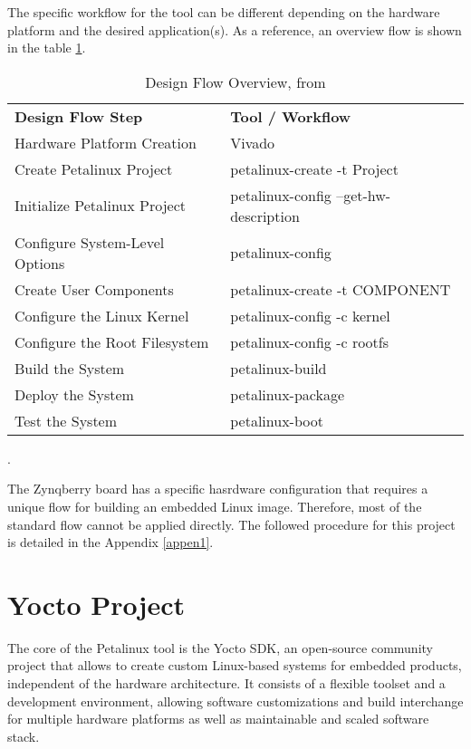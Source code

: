 The specific workflow for the tool can be different depending on the hardware platform and the
desired application(s). As a reference, an overview flow is shown in the table
\ref{table:design-flow-overview}.

\begin{table}[ht]
	\centering
	\footnotesize
	\begin{tabular} {| l | l |}
		\hline
		\textbf{Design Flow Step} & \textbf{Tool / Workflow} \\ [0.25cm]
		\arrayrulecolor[HTML]{B20738} 
		\hline \arrayrulecolor[HTML]{000000}
		Hardware Platform Creation & Vivado \\
		\hline
		Create Petalinux Project & petalinux-create -t Project \\
		\hline
		Initialize Petalinux Project & petalinux-config --get-hw-description \\
		\hline
		Configure System-Level Options & petalinux-config \\
		\hline
		Create User Components & petalinux-create -t COMPONENT \\
		\hline
		Configure the Linux Kernel & petalinux-config -c kernel \\
		\hline
		Configure the Root Filesystem & petalinux-config -c rootfs \\
		\hline
		Build the System & petalinux-build \\
		\hline
		Deploy the System & petalinux-package \\
		\hline
		Test the System & petalinux-boot \\
		\hline
	\end{tabular}
	\caption{Design Flow Overview, from \cite{UG1156}}\label{table:design-flow-overview}.
\end{table}

The Zynqberry board has a specific hasrdware configuration that requires a unique flow for building
an embedded Linux image. Therefore, most of the standard flow cannot be applied directly. The
followed procedure for this project is detailed in the Appendix \ref{appen1}.

\section{Yocto Project}

The core of the Petalinux tool is the Yocto SDK, an open-source community project that allows to
create custom Linux-based systems for embedded products, independent of the hardware architecture.
It consists of a flexible toolset and a development environment, allowing software customizations
and build interchange for multiple hardware platforms as well as maintainable and scaled software
stack.

